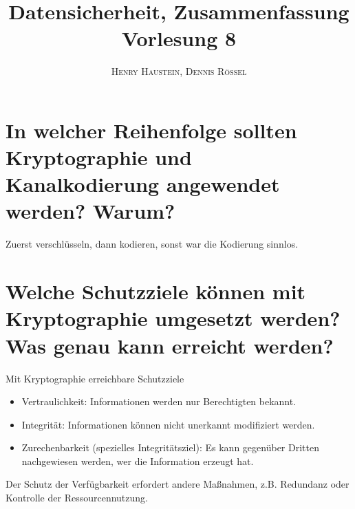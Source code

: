 \documentclass{article}
\title{\textbf{Datensicherheit, Zusammenfassung Vorlesung 8}}
\author{\textsc{Henry Haustein}, \textsc{Dennis Rössel}}
\date{}
\begin{document}
	\maketitle
	
	\section*{In welcher Reihenfolge sollten Kryptographie und Kanalkodierung angewendet werden? Warum?}
	Zuerst verschlüsseln, dann kodieren, sonst war die Kodierung sinnlos.
	
	\section*{Welche Schutzziele können mit Kryptographie umgesetzt werden? Was genau kann erreicht werden?}
	Mit Kryptographie erreichbare Schutzziele
	\begin{itemize}
		\item Vertraulichkeit: Informationen werden nur Berechtigten bekannt.
		\item Integrität: Informationen können nicht unerkannt modifiziert werden.
		\item Zurechenbarkeit (spezielles Integritätsziel): Es kann gegenüber Dritten nachgewiesen werden, wer die Information erzeugt hat.
	\end{itemize}
	Der Schutz der Verfügbarkeit erfordert andere Maßnahmen, z.B. Redundanz oder Kontrolle der Ressourcen\-nutzung.
	
\end{document}

